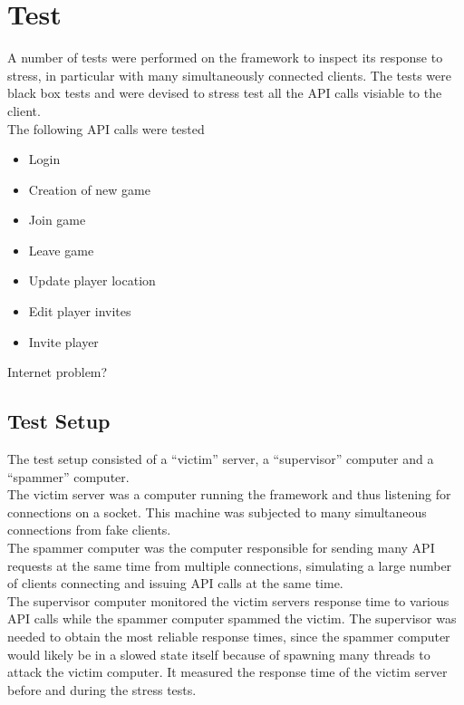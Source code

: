 \section{Test}
A number of tests were performed on the framework to inspect its response to stress, in particular with many simultaneously connected clients. The tests were black box tests and were devised to stress test all the API calls visiable to the client.\\

The following API calls were tested
\begin{itemize}
\item Login
\item Creation of new game
\item Join game
\item Leave game
\item Update player location
\item Edit player invites
\item Invite player
\end{itemize}

Internet problem?

\subsection{Test Setup}
The test setup consisted of a ``victim'' server, a ``supervisor'' computer and a ``spammer'' computer.\\

The victim server was a computer running the framework and thus listening for connections on a socket. This machine was subjected to many simultaneous connections from fake clients.\\

The spammer computer was the computer responsible for sending many API requests at the same time from multiple connections, simulating a large number of clients connecting and issuing API calls at the same time.\\

The supervisor computer monitored the victim servers response time to various API calls while the spammer computer spammed the victim. The supervisor was needed to obtain the most reliable response times, since the spammer computer would likely be in a slowed state itself because of spawning many threads to attack the victim computer. It measured the response time of the victim server before and during the stress tests.
